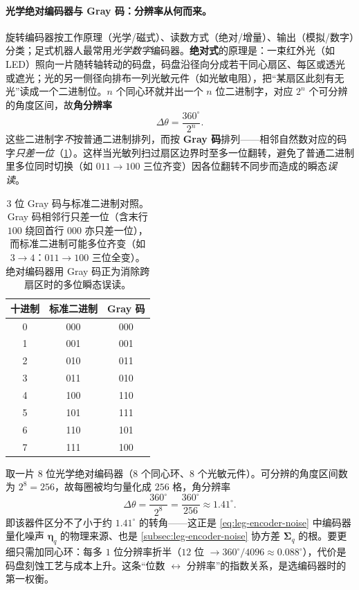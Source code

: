 \paragraph{光学绝对编码器与 Gray 码：分辨率从何而来。}
旋转编码器按工作原理（光学/磁式）、读数方式（绝对/增量）、输出（模拟/数字）分类；足式机器人最常用\emph{光学数字}编码器\cite{carlone2026handbook}。\textbf{绝对式}的原理是：一束红外光（如 LED）照向一片随转轴转动的码盘，码盘沿径向分成若干同心扇区、每区或透光或遮光；光的另一侧径向排布一列光敏元件（如光敏电阻），把“某扇区此刻有无光”读成一个二进制位。$n$ 个同心环就并出一个 $n$ 位二进制字，对应 $2^n$ 个可分辨的角度区间，故\textbf{角分辨率}
\[
  \Delta\theta=\frac{360^\circ}{2^n}.
\]
这些二进制字\emph{不}按普通二进制排列，而按 \textbf{Gray 码}排列——相邻自然数对应的码字\emph{只差一位}（\cref{tab:leg-graycode}）。这样当光敏列扫过扇区边界时至多一位翻转，避免了普通二进制里多位同时切换（如 $011\to100$ 三位齐变）因各位翻转不同步而造成的瞬态\emph{误读}。

\begin{table}[H]\centering\small
\caption{$3$ 位 Gray 码与标准二进制对照。Gray 码相邻行只差一位（含末行 $100$ 绕回首行 $000$ 亦只差一位），而标准二进制可能多位齐变（如 $3\!\to\!4$：$011\to100$ 三位全变）。绝对编码器用 Gray 码正为消除跨扇区时的多位瞬态误读。}
\label{tab:leg-graycode}
\begin{tabular}{ccc}
\toprule
十进制 & 标准二进制 & Gray 码 \\
\midrule
0 & 000 & 000 \\
1 & 001 & 001 \\
2 & 010 & 011 \\
3 & 011 & 010 \\
4 & 100 & 110 \\
5 & 101 & 111 \\
6 & 110 & 101 \\
7 & 111 & 100 \\
\bottomrule
\end{tabular}
\end{table}

\begin{example}[$8$ 位编码器的角分辨率]\label{ex:leg-encoder}
取一片 $8$ 位光学绝对编码器（$8$ 个同心环、$8$ 个光敏元件）。可分辨的角度区间数为 $2^8=256$，故每圈被均匀量化成 $256$ 格，角分辨率
\[
  \Delta\theta=\frac{360^\circ}{2^8}=\frac{360^\circ}{256}\approx1.41^\circ.
\]
即该器件区分不了小于约 $1.41^\circ$ 的转角——这正是 \cref{eq:leg-encoder-noise} 中编码器量化噪声 $\boldsymbol{\eta}_q$ 的物理来源、也是 \cref{subsec:leg-encoder-noise} 协方差 $\boldsymbol{\Sigma}_q$ 的根。要更细只需加同心环：每多 $1$ 位分辨率折半（$12$ 位 $\to360^\circ/4096\approx0.088^\circ$），代价是码盘刻蚀工艺与成本上升。这条“位数 $\leftrightarrow$ 分辨率”的指数关系，是选编码器时的第一权衡。
\end{example}

